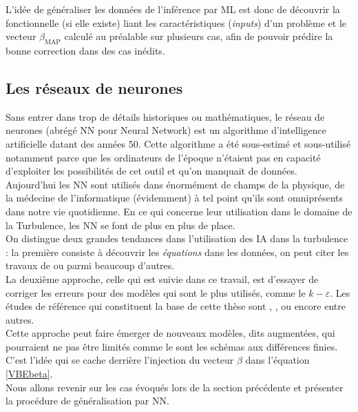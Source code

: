 \documentclass[a4paper,12pt]{article}
\newcommand{\keps}{$k-\varepsilon$}
\newcommand{\bmap}{\beta_{\text{MAP}}}
\newcommand\bk{\color{black}}
\newcommand\brick{\color{brick}}
\numberwithin{equation}{section} %
\begin{document}
\noindent L'idée de généraliser les données de l'inférence par ML est donc de découvrir la fonctionnelle (si elle existe) liant les caractéristiques (\textit{inputs}) d'un problème et le vecteur $\bmap$ calculé au préalable sur plusieurs cas, afin de pouvoir prédire la bonne correction dans des cas inédits. 
 
\brick \subsection{Les réseaux de neurones} \bk
\noindent Sans entrer dans trop de détails historiques ou mathématiques, le réseau de neurones (abrégé NN pour Neural Network) est un algorithme d'intelligence artificielle datant des années 50. Cette algorithme a été sous-estimé et sous-utilisé notamment parce que les ordinateurs de l'époque n'étaient pas en capacité d'exploiter les possibilités de cet outil et qu'on manquait de données.\\
Aujourd'hui les NN sont utilisés dans énormément de champs de la physique, de la médecine de l'informatique (évidemment) à tel point qu'ils sont omniprésents dans notre vie quotidienne. En ce qui concerne leur utilisation dans le domaine de la Turbulence, les NN se font de plus en plus de place. \\
On distingue deux grandes tendances dans l'utilisation des IA dans la turbulence : la première consiste à découvrir les \textit{équations} dans les données, on peut citer les travaux de \citep{kutz2017deep} ou \citep{raissi2018hidden} parmi beaucoup d'autres. \\
La deuxième approche, celle qui est suivie dans ce travail, est d'essayer de corriger les erreurs pour des modèles qui sont le plus utilisés, comme le \keps $ $. Les études de référence qui constituent la base de cette thèse sont \citep{parish2016paradigm}, \citep{singh2017machine}, \citep{wu2018data} ou encore \citep{wang2017physics} entre autres. \\

\noindent Cette approche peut faire émerger de nouveaux modèles, dits augmentées, qui pourraient ne pas être limités comme le sont les schémas aux différences finies. C'est l'idée qui se cache derrière l'injection du vecteur $\beta$ dans l'équation \eqref{VBEbeta}.\\
\noindent Nous allons revenir sur les cas évoqués lors de la section précédente et présenter la procédure de généralisation par NN.
\end{document}

